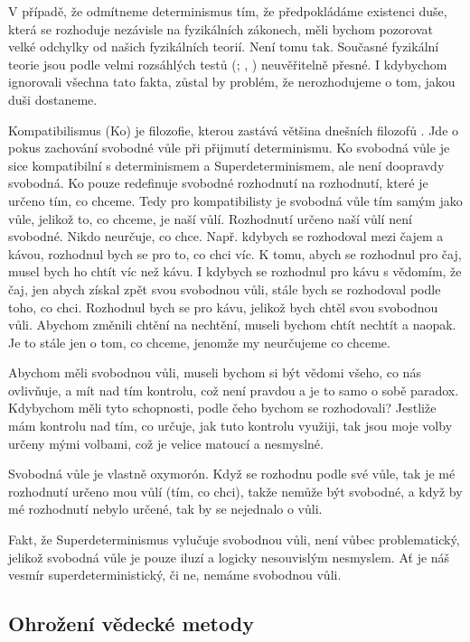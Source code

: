V případě, že odmítneme determinismus tím, že předpokládáme existenci duše, která se rozhoduje nezávisle na fyzikálních zákonech, měli bychom pozorovat velké odchylky od našich fyzikálních teorií. Není tomu tak. Současné fyzikální teorie jsou podle velmi rozsáhlých testů (\cite{GenRelAcc}; , \cite*{QEDAcc}) neuvěřitelně přesné. I kdybychom ignorovali všechna tato fakta, zůstal by problém, že nerozhodujeme o tom, jakou duši dostaneme.

Kompatibilismus (Ko) je filozofie, kterou zastává většina dnešních filozofů \parencite{FWSur}. Jde o pokus zachování svobodné vůle při přijmutí determinismu. Ko svobodná vůle je sice kompatibilní s determinismem a Superdeterminismem, ale není doopravdy svobodná. Ko pouze redefinuje svobodné rozhodnutí na rozhodnutí, které je určeno tím, co chceme. Tedy pro kompatibilisty je svobodná vůle tím samým jako vůle, jelikož to, co chceme, je naší vůlí. Rozhodnutí určeno naší vůlí není svobodné. Nikdo neurčuje, co chce. Např. kdybych se rozhodoval mezi čajem a kávou, rozhodnul bych se pro to, co chci víc. K tomu, abych se rozhodnul pro čaj, musel bych ho chtít víc než kávu. I kdybych se rozhodnul pro kávu s vědomím, že  čaj, jen abych získal zpět svou svobodnou vůli, stále bych se rozhodoval podle toho, co chci. Rozhodnul bych se pro kávu, jelikož bych chtěl  svou svobodnou vůli. Abychom změnili chtění na nechtění, museli bychom chtít nechtít a naopak. Je to stále jen o tom, co chceme, jenomže my neurčujeme co chceme.

Abychom měli svobodnou vůli, museli bychom si být vědomi všeho, co nás ovlivňuje, a mít nad tím kontrolu, což není pravdou a je to samo o sobě paradox. Kdybychom měli tyto schopnosti, podle čeho bychom se rozhodovali? Jestliže mám kontrolu nad tím, co určuje, jak tuto kontrolu využiji, tak jsou moje volby určeny mými volbami, což je velice matoucí a nesmyslné.

Svobodná vůle je vlastně oxymorón. Když se rozhodnu podle své vůle, tak je mé rozhodnutí určeno mou vůlí (tím, co chci), takže nemůže být svobodné, a když by mé rozhodnutí nebylo určené, tak by se nejednalo o vůli.

Fakt, že Superdeterminismus vylučuje svobodnou vůli, není vůbec problematický, jelikož svobodná vůle je pouze iluzí a logicky nesouvislým nesmyslem. Ať je náš vesmír superdeterministický, či ne, nemáme svobodnou vůli.

\clearpage

\subsection{Ohrožení vědecké metody}

